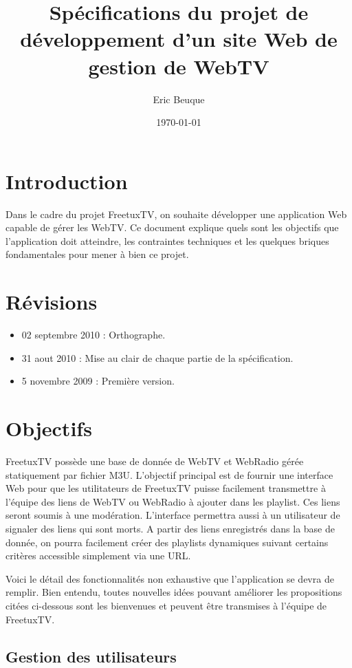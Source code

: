 \documentclass[10pt,a4paper]{article}
\author{Eric Beuque}
\title{Spécifications du projet de développement d'un site Web de gestion de WebTV}
\date{\today}
\begin{document}
\maketitle

\section*{Introduction}

Dans le cadre du projet FreetuxTV, on souhaite développer une application Web capable de gérer les WebTV. Ce document explique quels sont les objectifs que l'application doit atteindre, les contraintes techniques et les quelques briques fondamentales pour mener à bien ce projet.

\section*{Révisions}

\begin{itemize}
\item 02 septembre 2010 : Orthographe.
\item 31 aout 2010 : Mise au clair de chaque partie de la spécification.
\item 5 novembre 2009 : Première version.
\end{itemize}

\section{Objectifs}

FreetuxTV possède une base de donnée de WebTV et WebRadio gérée statiquement par fichier M3U. L'objectif principal est de fournir une interface Web pour que les utilitateurs de FreetuxTV puisse facilement transmettre à l'équipe des liens de WebTV ou WebRadio à ajouter dans les playlist. Ces liens seront soumis à une modération. L'interface permettra aussi à un utilisateur de signaler des liens qui sont morts. A partir des liens enregistrés dans la base de donnée, on pourra facilement créer des playlists dynamiques suivant certains critères accessible simplement via une URL.

Voici le détail des fonctionnalités non exhaustive que l'application se devra de remplir. Bien entendu, toutes nouvelles idées pouvant améliorer les propositions citées ci-dessous sont les bienvenues et peuvent être transmises à l'équipe de FreetuxTV.

\subsection{Gestion des utilisateurs}
\end{document}
